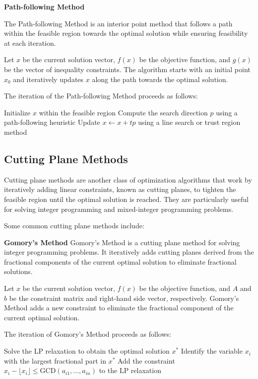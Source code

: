 \documentclass[12pt]{book} %
\begin{document}
\textbf{Path-following Method}

The Path-following Method is an interior point method that follows a path within the feasible region towards the optimal solution while ensuring feasibility at each iteration.

Let \(x\) be the current solution vector, \(f(x)\) be the objective function, and \(g(x)\) be the vector of inequality constraints. The algorithm starts with an initial point \(x_0\) and iteratively updates \(x\) along the path towards the optimal solution.

The iteration of the Path-following Method proceeds as follows:
\FloatBarrier
\begin{algorithm}[H]
\caption{Path-following Method}
\begin{algorithmic}[1]
\State Initialize \(x\) within the feasible region
\State Compute the search direction \(p\) using a path-following heuristic
\State Update \(x \leftarrow x + t p\) using a line search or trust region method
\EndWhile
\end{algorithmic}
\end{algorithm}
\FloatBarrier

\subsection{Cutting Plane Methods}
Cutting plane methods are another class of optimization algorithms that work by iteratively adding linear constraints, known as cutting planes, to tighten the feasible region until the optimal solution is reached. They are particularly useful for solving integer programming and mixed-integer programming problems.

Some common cutting plane methods include:

\textbf{Gomory's Method}
\FloatBarrier
Gomory's Method is a cutting plane method for solving integer programming problems. It iteratively adds cutting planes derived from the fractional components of the current optimal solution to eliminate fractional solutions.

Let \(x\) be the current solution vector, \(f(x)\) be the objective function, and \(A\) and \(b\) be the constraint matrix and right-hand side vector, respectively. Gomory's Method adds a new constraint to eliminate the fractional component of the current optimal solution.

The iteration of Gomory's Method proceeds as follows:
\FloatBarrier
\begin{algorithm}[H]
\caption{Gomory's Method}
\begin{algorithmic}[1]
\State Solve the LP relaxation to obtain the optimal solution \(x^*\)
\State Identify the variable \(x_i\) with the largest fractional part in \(x^*\)
\State Add the constraint \(x_i - \lfloor x_i \rfloor \leq \text{{GCD}}(a_{i1}, \ldots, a_{in})\) to the LP relaxation
\EndIf
\end{algorithmic}
\end{algorithm}
\FloatBarrier
\end{document}
